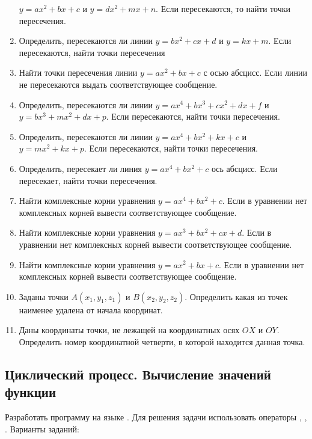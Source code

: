 \begin{enumerate}
$y=ax^2+bx+c$ и $y=dx^2+mx+n$. Если
пересекаются, то найти точки пересечения.
\item Определить, пересекаются ли линии
$y=bx^2+cx+d$ и
$y=kx+m$. Если пересекаются, найти точки пересечения
\item Найти точки пересечения линии
$y=ax^2+bx+c$ с осью
абсцисс. Если линии не пересекаются выдать соответствующее сообщение.
\item Определить, пересекаются ли линии
$y=ax^4+bx^3+cx^2+dx+f$
и
$y=bx^3+mx^2+dx+p$.
Если пересекаются, найти точки пересечения.
\item Определить, пересекаются ли линии
$y=ax^4+bx^2+kx+c$
и
$y=mx^2+kx+p$.
Если пересекаются, найти точки пересечения.
\item Определить, пересекает ли линия
$y=ax^4+bx^2+c$
ось абсцисс. Если пересекает, найти точки пересечения.
\item Найти комплексные корни уравнения
$y=ax^4+bx^2+c$.
Если в уравнении нет комплексных корней вывести соответствующее сообщение.
\item Найти комплексные корни уравнения
$y=ax^3+bx^2+cx+d$. Если в
уравнении нет комплексных корней вывести соответствующее сообщение.
\item Найти комплексные корни уравнения $y=ax^2+bx+c$. Если в
уравнении нет комплексных корней вывести соответствующее сообщение.
\item Заданы точки $A(x_1,y_1,z_1)$ и $B(x_2,y_2,z_2)$. Определить какая из точек наименее удалена от начала координат.
\item Даны координаты точки, не лежащей на координатных осях $OX$ и $OY$. Определить номер координатной четверти, в которой
находится данная точка.
\end{enumerate}

\subsection[Циклический процесс. Вычисление значений функции]{Циклический процесс. Вычисление значений функции}

Разработать программу на языке . Для решения задачи использовать операторы ,
, . Варианты заданий:

